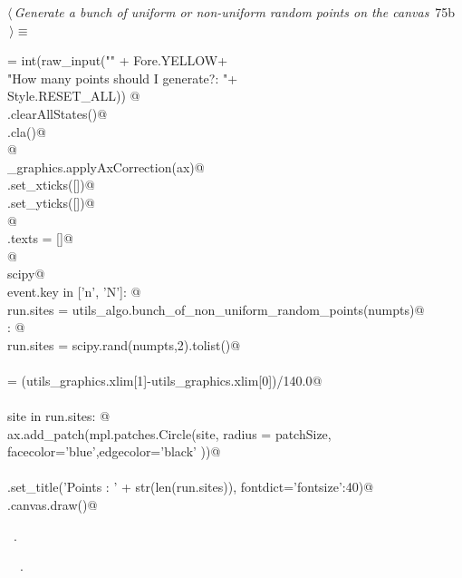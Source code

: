 \documentclass[11.5pt]{report}
\begin{document}
\begin{flushleft} \small\label{scrap106}\raggedright\small
{} $\langle\,${\itshape Generate a bunch of uniform or non-uniform random points on the canvas}\nobreak\ {\footnotesize {75b}}$\,\rangle\equiv$
\vspace{-1ex}
\begin{list}{}{} \item
\mbox{}\verb@numpts = int(raw_input("\n" + Fore.YELLOW+\@\\
\mbox{}\verb@                       "How many points should I generate?: "+\@\\
\mbox{}\verb@                       Style.RESET_ALL)) @\\
\mbox{}\verb@run.clearAllStates()@\\
\mbox{}\verb@ax.cla()@\\
\mbox{}\verb@               @\\
\mbox{}\verb@utils_graphics.applyAxCorrection(ax)@\\
\mbox{}\verb@ax.set_xticks([])@\\
\mbox{}\verb@ax.set_yticks([])@\\
\mbox{}\verb@                @\\
\mbox{}\verb@fig.texts = []@\\
\mbox{}\verb@                 @\\
\mbox{}\verb@import scipy@\\
\mbox{}\verb@if event.key in ['n', 'N']: @\\
\mbox{}\verb@        run.sites = utils_algo.bunch_of_non_uniform_random_points(numpts)@\\
\mbox{}\verb@else : @\\
\mbox{}\verb@        run.sites = scipy.rand(numpts,2).tolist()@\\
\mbox{}\verb@@\\
\mbox{}\verb@patchSize  = (utils_graphics.xlim[1]-utils_graphics.xlim[0])/140.0@\\
\mbox{}\verb@@\\
\mbox{}\verb@for site in run.sites:      @\\
\mbox{}\verb@    ax.add_patch(mpl.patches.Circle(site, radius = patchSize, \@\\
\mbox{}\verb@                 facecolor='blue',edgecolor='black' ))@\\
\mbox{}\verb@@\\
\mbox{}\verb@ax.set_title('Points : ' + str(len(run.sites)), fontdict={'fontsize':40})@\\
\mbox{}\verb@fig.canvas.draw()@\\
\mbox{}\verb@@{\NWsep}
\end{list}
\vspace{-1.5ex}
\footnotesize
\begin{list}{}{\setlength{\itemsep}{-\parsep}\setlength{\itemindent}{-\leftmargin}}
\item \NWtxtMacroRefIn\ .
\item \NWtxtIdentsUsed\nobreak\  \verb@clearAllStates@\nobreak\ .
\item{}
\end{list}
\vspace{4ex}
\end{flushleft}
\end{document}
